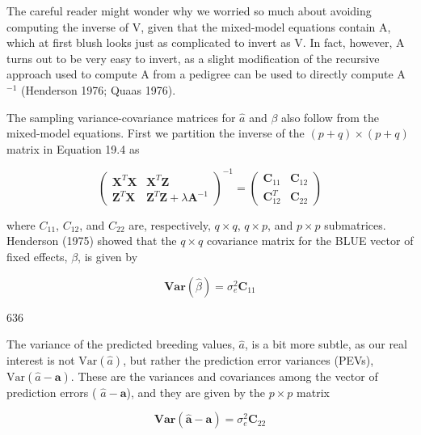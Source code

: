 \documentclass{article}
\begin{document}
The careful reader might wonder why we worried so much about avoiding computing the inverse of V, given that the mixed-model equations contain A, which at first blush looks just as complicated to invert as V. In fact, however, A turns out to be very easy to invert, as a slight modification of the recursive approach used to compute A from a pedigree can be used to directly compute A $ ^{-1} $ (Henderson 1976; Quaas 1976).

The sampling variance-covariance matrices for  $ \hat{a} $ and  $ \beta $ also follow from the mixed-model equations. First we partition the inverse of the  $ (p+q) \times (p+q) $ matrix in Equation 19.4 as

\begin{equation}
\begin{pmatrix}\mathbf{X}^{T}\mathbf{X}&\mathbf{X}^{T}\mathbf{Z}\\\mathbf{Z}^{T}\mathbf{X}&\mathbf{Z}^{T}\mathbf{Z}+\lambda\mathbf{A}^{-1}\end{pmatrix}^{-1}=\begin{pmatrix}\mathbf{C}_{11}&\mathbf{C}_{12}\\\mathbf{C}_{12}^{T}&\mathbf{C}_{22}\end{pmatrix}
\tag{19.5a}
\label{eq:19_5a}
\end{equation}

where $C_{11}$, $C_{12}$, and $C_{22}$ are, respectively, $q \times q$, $q \times p$, and $p \times p$ submatrices. Henderson (1975) showed that the $q \times q$ covariance matrix for the BLUE vector of fixed effects, $\beta$, is given by

\begin{equation}
\mathbf{V a r}(\widehat{\beta})=\sigma_{e}^{2}\mathbf{C}_{11}
\tag{19.5b}
\label{eq:19_5b}
\end{equation}

636

The variance of the predicted breeding values,  $ \hat{a} $, is a bit more subtle, as our real interest is not  $ \text{Var}(\hat{a}) $, but rather the prediction error variances (PEVs),  $ \text{Var}(\hat{a} - \mathbf{a}) $. These are the variances and covariances among the vector of prediction errors ( $ \hat{a} - \mathbf{a} $), and they are given by the  $ p \times p $ matrix

\begin{equation}
\mathbf{V a r}(\widehat{\mathbf{a}}-\mathbf{a})=\sigma_{e}^{2}\mathbf{C}_{22}
\tag{19.5c}
\label{eq:19_5c}
\end{equation}
\end{document}
